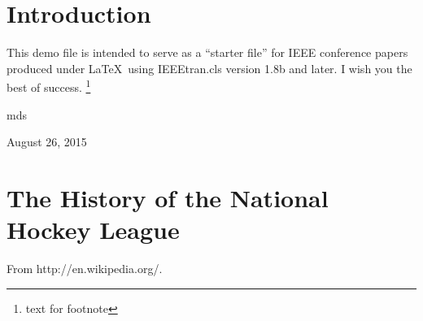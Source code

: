\documentclass[conference]{IEEEtran}
\begin{document}


\IEEEoverridecommandlockouts
\makeatletter{}\makeatother
{}


\maketitle

\begin{abstract}
The abstract goes here.
\end{abstract}





%
\IEEEpeerreviewmaketitle



\section{Introduction}
This demo file is intended to serve as a ``starter file''
for IEEE conference papers produced under \LaTeX\ using
IEEEtran.cls version 1.8b and later.
I wish you the best of success.
\footnote{text for footnote}

\hfill mds

\hfill August 26, 2015


\section{The History of the National Hockey League}
From
http://en.wikipedia.org/.
\end{document}
